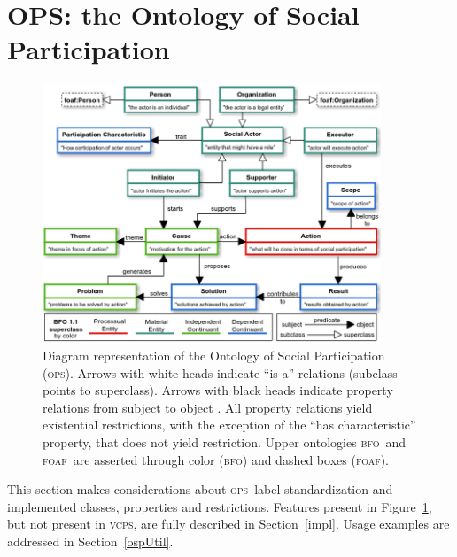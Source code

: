 \documentclass[10pt,letterpaper]{article}
\newcommand{\ops}{\textsc{ops}}
\newcommand{\vcps}{\textsc{vcps}}
\newcommand{\bfo}{\textsc{bfo}}
\newcommand{\foaf}{\textsc{foaf}}
\begin{document}

% 
% 
% 
% 

\section{OPS: the Ontology of Social Participation}\label{exp}
\begin{figure}
    \centering
    \includegraphics[width=0.9\textwidth]{figs/opsBFO___}
    \caption{Diagram representation of the Ontology of Social Participation (\ops).
    Arrows with white heads indicate ``is a'' relations (subclass points to superclass).
    Arrows with black heads indicate property relations from subject to object .
    All property relations yield existential restrictions,
    with the exception of the ``has characteristic'' property,
    that does not yield restriction.
    Upper ontologies \bfo\ and \foaf\ are asserted through color (\bfo) and dashed boxes (\foaf).}
    \label{fig:v1}
\end{figure}
This section makes considerations about \ops\ label standardization and implemented classes,
properties and restrictions.
Features present in Figure~\ref{fig:v1}, but not present in \vcps,
are fully described in Section~\ref{impl}.
Usage examples are addressed in Section~\ref{ospUtil}. 
\end{document}
